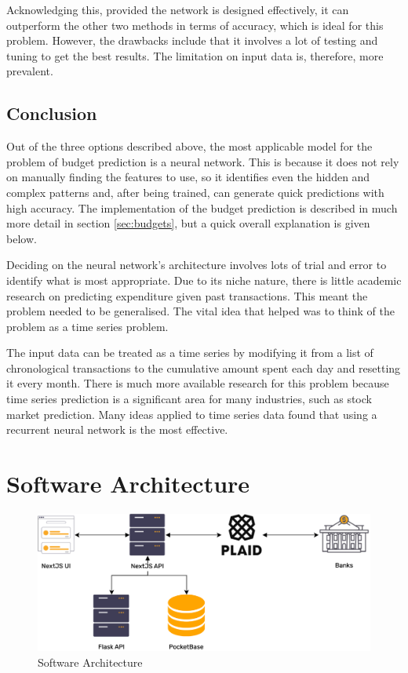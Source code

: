 Acknowledging this, provided the network is designed effectively, it can outperform the other two methods in terms of accuracy, which is ideal for this problem. However, the drawbacks include that it involves a lot of testing and tuning to get the best results. The limitation on input data is, therefore, more prevalent.

\subsection{Conclusion}
Out of the three options described above, the most applicable model for the problem of budget prediction is a neural network. This is because it does not rely on manually finding the features to use, so it identifies even the hidden and complex patterns and, after being trained, can generate quick predictions with high accuracy. The implementation of the budget prediction is described in much more detail in section \ref{sec:budgets}, but a quick overall explanation is given below.

Deciding on the neural network's architecture involves lots of trial and error to identify what is most appropriate. Due to its niche nature, there is little academic research on predicting expenditure given past transactions. This meant the problem needed to be generalised. The vital idea that helped was to think of the problem as a time series problem.

The input data can be treated as a time series by modifying it from a list of chronological transactions to the cumulative amount spent each day and resetting it every month. There is much more available research for this problem because time series prediction is a significant area for many industries, such as stock market prediction. Many ideas applied to time series data found that using a recurrent neural network is the most effective.
\section{Software Architecture}

\begin{figure}[H]
	\centering
	\includegraphics[width=\textwidth]{images/software_architecture.png}
	\caption{Software Architecture}
	\label{fig:SoftwareArchitecture}
\end{figure}

